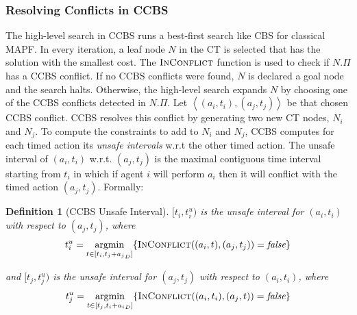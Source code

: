 \documentclass[review]{elsarticle}
\newtheorem{definition}{Definition}
\newcommand{\argmin}{\operatornamewithlimits{argmin}}
\newcommand{\tuple}[1]{\ensuremath{\left \langle #1 \right \rangle }}
\newcommand{\ccbs}{\ac{CCBS}\xspace}
\newcommand{\cbs}{\ac{CBS}\xspace}
\newcommand{\ct}{\ac{CT}\xspace}
\newcommand{\mapf}{\ac{MAPF}\xspace}
\newcommand{\false}{\textit{false}\xspace}
\newcommand{\inconflict}{\textsc{InConflict}\xspace}
\begin{document}
\subsubsection{Resolving Conflicts in \ccbs}
The high-level search in \ccbs runs a best-first search like  \cbs for classical \mapf. In every iteration, a leaf node $N$ in the \ct is selected that has the solution with the smallest cost. 
The $\inconflict$ function is used to check if $N.\Pi$ has a \ccbs conflict. If no \ccbs conflicts were found, $N$ is declared a goal node and the search halts. Otherwise, the high-level search expands $N$ by choosing one of the \ccbs conflicts 
detected in $N.\Pi$. 
Let $\tuple{(a_i, t_i), (a_j, t_j)}$ be that chosen \ccbs conflict. 
\ccbs resolves this conflict by generating two new \ct nodes, $N_i$ and $N_j$. 
To compute the constraints to add to $N_i$ and $N_j$, \ccbs computes for each timed action its \emph{unsafe intervals} w.r.t the other timed action. 
The unsafe interval of $(a_i,t_i)$ w.r.t. $(a_j,t_j)$ is the maximal contiguous time interval starting from $t_i$ in which if agent $i$ will perform $a_i$ then it will conflict with the timed action $(a_j,t_j)$.  
Formally:
\begin{definition}[\ccbs Unsafe Interval]
$[t_i, t^u_i)$ is the unsafe interval for $(a_i,t_i)$ with respect to $(a_j,t_j)$, where
\begin{equation}
    t^u_i = 
    \argmin _{t\in [t_i, t_j + {a_j}_D]}
    \{ \inconflict ((a_i,t),
        (a_j,t_j)) = \false\}
        \label{eq:unsafei}
\end{equation}

and $[t_j, t^u_j)$ is the unsafe interval for 
$(a_j,t_j)$ with respect to $(a_i,t_i)$, where
\begin{equation}
    t^u_j = 
    \argmin _{t\in [t_j, t_i + {a_i}_D]}
    \{ \inconflict ((a_i,t_i),
        (a_j,t)) = \false\}
        \label{eq:unsafej}
\end{equation}

\label{def:unsafe-interval}
\end{definition}



\end{document}
